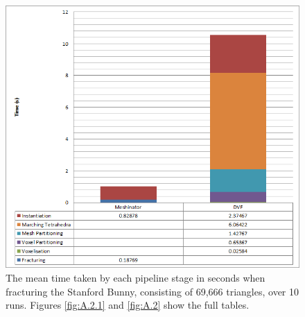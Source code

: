 \begin{figure}[h!]
\centerline{\includegraphics[scale=0.95]{../Logs/single_bunny_latency.png}}
\caption{The mean time taken by each pipeline stage in seconds when fracturing the Stanford Bunny, consisting of 69,666 triangles, over 10 runs. Figures \ref{fig:A.2.1} and \ref{fig:A.2} show the full tables.}
\label{fig:4.18.1}
\end{figure}

\FloatBarrier


